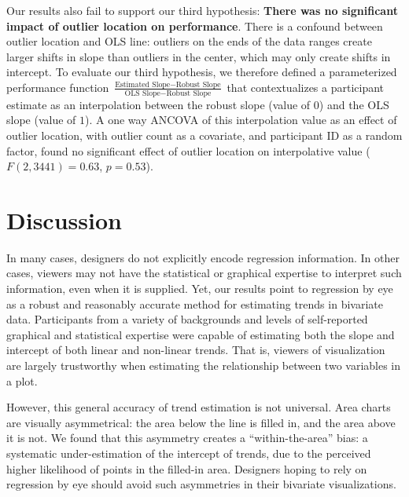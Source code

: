 \documentclass{sigchi}
\begin{document}
Our results also fail to support our third hypothesis: \textbf{There was no significant impact of outlier location on performance}. There is a confound between outlier location and OLS line: outliers on the ends of the data ranges create larger shifts in slope than outliers in the center, which may only create shifts in intercept. To evaluate our third hypothesis, we therefore defined a parameterized performance function $\frac{\text{Estimated Slope}-\text{Robust Slope}}{\text{OLS Slope} - \text{Robust Slope}}$ that contextualizes a participant estimate as an interpolation between the robust slope (value of $0$) and the OLS slope (value of $1$). A one way ANCOVA of this interpolation value as an effect of outlier location, with outlier count as a covariate, and participant ID as a random factor, found no significant effect of outlier location on interpolative value ($F(2,3441)=0.63$, $p=0.53$).


\section{Discussion}

In many cases, designers do not explicitly encode regression information. In other cases, viewers may not have the statistical or graphical expertise to interpret such information, even when it is supplied. Yet, our results point to regression by eye as a robust and reasonably accurate method for estimating trends in bivariate data. Participants from a variety of backgrounds and levels of self-reported graphical and statistical expertise were capable of estimating both the slope and intercept of both linear and non-linear trends. That is, viewers of visualization are largely trustworthy when estimating the relationship between two variables in a plot.

However, this general accuracy of trend estimation is not universal. Area charts are visually asymmetrical: the area below the line is filled in, and the area above it is not. We found that this asymmetry creates a ``within-the-area'' bias: a systematic under-estimation of the intercept of trends, due to the perceived higher likelihood of points in the filled-in area. Designers hoping to rely on regression by eye should avoid such asymmetries in their bivariate visualizations.
\end{document}
